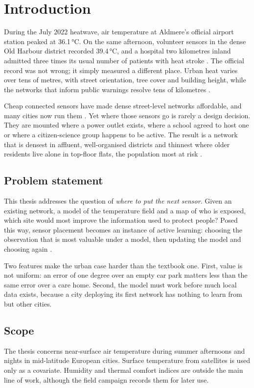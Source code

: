\chapter{Introduction}\label{ch:intro}

During the July 2022 heatwave, air temperature at Aldmere's official
airport station peaked at 36.1\,°C. On the same afternoon, volunteer
sensors in the dense Old Harbour district recorded 39.4\,°C, and a
hospital two kilometres inland admitted three times its usual number of
patients with heat stroke \parencite{rautio2023harbour}. The official
record was not wrong; it simply measured a different place. Urban heat
varies over tens of metres, with street orientation, tree cover and
building height, while the networks that inform public warnings resolve
tens of kilometres \parencite{oke2017urban}.

Cheap connected sensors have made dense street-level networks
affordable, and many cities now run them
\parencite{chapman2017crowdsourcing,meier2017crowdsourcing}. Yet where
those sensors go is rarely a design decision. They are mounted where a
power outlet exists, where a school agreed to host one or where a
citizen-science group happens to be active. The result is a network that
is densest in affluent, well-organised districts and thinnest where
older residents live alone in top-floor flats, the population most at
risk \parencite{hsu2021disproportionate}.

\section{Problem statement}

This thesis addresses the question of \emph{where to put the next
sensor}. Given an existing network, a model of the temperature field and
a map of who is exposed, which site would most improve the information
used to protect people? Posed this way, sensor placement becomes an
instance of active learning: choosing the observation that is most
valuable under a model, then updating the model and choosing again
\parencite{krause2008near,settles2012active}.

Two features make the urban case harder than the textbook one. First,
value is not uniform: an error of one degree over an empty car park
matters less than the same error over a care home. Second, the model
must work before much local data exists, because a city deploying its
first network has nothing to learn from but other cities.

\section{Scope}

The thesis concerns near-surface air temperature during summer
afternoons and nights in mid-latitude European cities. Surface
temperature from satellites is used only as a covariate. Humidity and
thermal comfort indices are outside the main line of work, although the
field campaign records them for later use.
